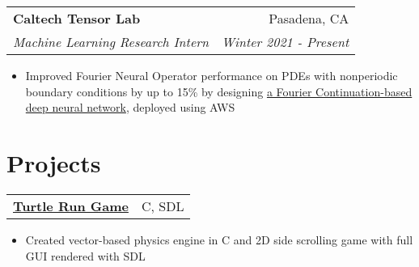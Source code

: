 \documentclass[letterpaper,11pt]{article}
\makeatletter
\newcommand{\resitem}[1]{\item[--] #1}
\newcommand{\ressubheading}[4]{
	\begin{tabular*}{7.5in}{l@{\extracolsep{\fill}}r}
			\textbf{#1} & #2 \\
			\textit{#3} & \textit{#4}
	\end{tabular*}
}
\newcommand{\projsubheading}[2]{
	\begin{tabular*}{7.5in}{l@{\extracolsep{\fill}}r}
		\textbf{#1} & #2
	\end{tabular*}
}
\makeatother
\begin{document}
\ressubheading{Caltech Tensor Lab}
			  {Pasadena, CA}
			  {Machine Learning Research Intern}
			  {Winter 2021 - Present}
\begin{itemize}
	\resitem{
		Improved Fourier Neural Operator performance on PDEs with nonperiodic
		boundary conditions by up to 15\% by designing
		\href{https://symposium.foragerone.com/caltech-sfp-summer-seminar-day-2021/presentations/32348}
			 {a Fourier Continuation-based deep neural network},
		deployed using AWS
	}
\end{itemize}


\section{Projects}


\projsubheading{\href{https://github.com/derekqin8/turtle-run}{Turtle Run Game}}
			   {C, SDL}
\begin{itemize}
	\resitem{
		Created vector-based physics engine in C and 2D side scrolling game with
		full GUI rendered with SDL
	}
\end{itemize}
\end{document}
